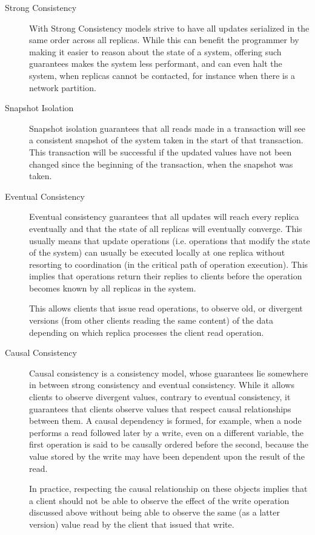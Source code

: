 \begin{description}
  \item[Strong Consistency] With Strong Consistency models strive to have all updates serialized in the same order across all replicas. While this can benefit the programmer by making it easier to reason about the state of a system, offering such guarantees makes the system less performant, and can even halt the system, when replicas cannot be contacted, for instance when there is a network partition.
  
  \item[Snapshot Isolation] Snapshot isolation\cite{snapshot_integrity} guarantees that all reads made in a transaction will see a consistent snapshot of the system taken in the start of that transaction. This transaction will be successful if the updated values have not been changed since the beginning of the transaction, when the snapshot was taken.
  
  \item[Eventual Consistency] Eventual consistency\cite{eventual} guarantees that all updates will reach every replica eventually and that the state of all replicas will eventually converge. This usually means that update operations (i.e. operations that modify the state of the system) can usually be executed locally at one replica without resorting to coordination (in the critical path of operation execution). This implies that operations return their replies to clients before the operation becomes known by all replicas in the system.\par
	This allows clients that issue read operations, to observe old, or divergent versions (from other clients reading the same content) of the data depending on which replica processes the client read operation.
	
  \item[Causal Consistency] Causal consistency is a consistency model, whose guarantees lie somewhere in between strong consistency and eventual consistency. While it allows clients to observe divergent values, contrary to eventual consistency, it guarantees that clients observe values that respect causal relationships between them\cite{chainreaction, lamport_time}. A causal dependency is formed, for example, when a node performs a read followed later by a write, even on a different variable, the first operation is said to be causally ordered before the second, because the value stored by the write may have been dependent upon the result of the read.\par
  In practice, respecting the causal relationship on these objects implies that a client should not be able to observe the effect of the write operation discussed above without being able to observe the same (as a latter version) value read by the client that issued that write.
\end{description}

